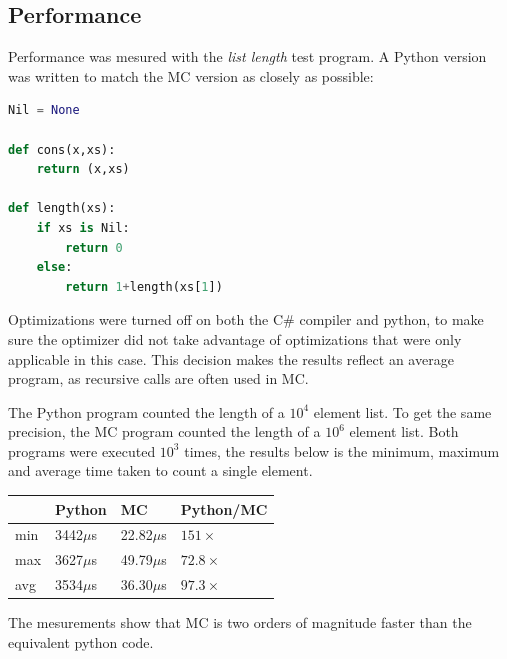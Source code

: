 \subsection{Performance}

Performance was mesured with the \textit{list length} test program.
A Python version was written to match the MC version as closely as possible:

\begin{lstlisting}[language=python]
Nil = None

def cons(x,xs):
    return (x,xs)

def length(xs):
    if xs is Nil:
        return 0
    else:
        return 1+length(xs[1])
\end{lstlisting}

Optimizations were turned off on both the C\# compiler and python, to make sure the optimizer did not take advantage of optimizations that were only applicable in this case.
This decision makes the results reflect an average program, as recursive calls are often used in MC.

The Python program counted the length of a $10^4$ element list.
To get the same precision, the MC program counted the length of a $10^6$ element list.
Both programs were executed $10^3$ times, the results below is the minimum, maximum and average time taken to count a single element.

\begin{tabular}{l|lll}
& Python & MC & Python/MC \\
\hline
min &   3442$\mu$s & 22.82$\mu$s & $151\times$ \\
max &   3627$\mu$s & 49.79$\mu$s & $72.8\times$ \\
avg &   3534$\mu$s & 36.30$\mu$s & $97.3\times$ \\
\end{tabular}

The mesurements show that MC is two orders of magnitude faster than the equivalent python code.

